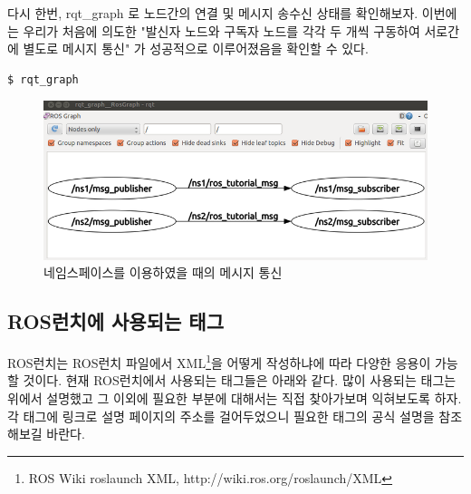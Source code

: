 다시 한번, rqt\_graph 로 노드간의 연결 및 메시지 송수신 상태를 확인해보자. 이번에는 우리가 처음에 의도한 "발신자 노드와 구독자 노드를 각각 두 개씩 구동하여 서로간에 별도로 메시지 통신" 가 성공적으로 이루어졌음을 확인할 수 있다.

\begin{lstlisting}[language=ROS]
$ rqt_graph
\end{lstlisting}

\begin{figure}[h]
\centering\includegraphics[width=0.9\columnwidth]{pictures/chapter7/rqt_graph_oroca_ros_tutorials_union2.png}
\caption{네임스페이스를 이용하였을 때의 메시지 통신}
\end{figure}

\subsection{ROS런치에 사용되는 태그}

ROS런치는 ROS런치 파일에서 XML\footnote{ROS Wiki roslaunch XML,  http://wiki.ros.org/roslaunch/XML}을 어떻게 작성하냐에 따라 다양한 응용이 가능할 것이다. 현재 ROS런치에서 사용되는 태그들은 아래와 같다. 많이 사용되는 태그는 위에서 설명했고 그 이외에 필요한 부분에 대해서는 직접 찾아가보며 익혀보도록 하자. 각 태그에 링크로 설명 페이지의 주소를 걸어두었으니 필요한 태그의 공식 설명을 참조해보길 바란다.


